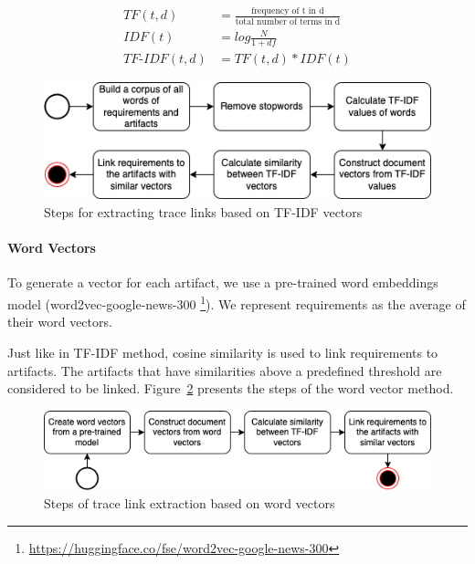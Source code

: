   \begin{align}
    TF(t,d) &= \frac{\text{frequency of t in d}}{\text{total number of terms in d}} \label{eq:tf} \\
    IDF(t) &= log\frac{N}{1+df} \label{eq:idf}\\
    TF\text{-}IDF(t,d) &= TF(t,d)*IDF(t) \label{eq:tfidf}
  \end{align}

      \begin{figure}[H]
        \centering
        \includegraphics[width=0.95\linewidth]{figs/tfidfvector2.png}
        \caption{Steps for extracting trace links based on TF-IDF vectors}
        \label{fig:tfidfvec}
      \end{figure}

      \paragraph{Word Vectors} To generate a vector for each artifact, we use a pre-trained word embeddings model (word2vec-google-news-300 \footnote{\url{https://huggingface.co/fse/word2vec-google-news-300}}). 
      We represent requirements as the average of their word vectors. 

      Just like in TF-IDF method, cosine similarity is used to link requirements to artifacts.
      The artifacts that have similarities above a predefined threshold are considered to be linked. 
      Figure~\ref{fig:wordvec} presents the steps of the word vector method.

       \begin{figure}[htb]
        \centering
        \includegraphics[width=0.99\linewidth]{figs/wordvector.png}
        \caption{Steps of trace link extraction based on word vectors}
        \label{fig:wordvec}
      \end{figure}



